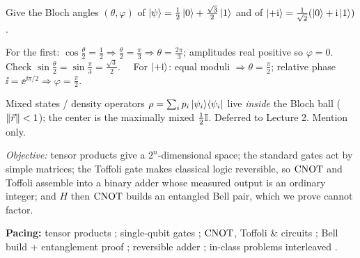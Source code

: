 \documentclass[11pt]{article}
\begin{document}
\begin{inclass}\label{ic:bloch}
Give the Bloch angles $(\theta,\varphi)$ of $\ket{\psi}=\tfrac12\ket0+\tfrac{\sqrt3}{2}\ket1$
and of $\ket{+\mathrm{i}}=\tfrac1{\sqrt2}(\ket0+\mathrm{i}\ket1)$.
\end{inclass}
\begin{answer}
For the first: $\cos\tfrac\theta2=\tfrac12\Rightarrow\tfrac\theta2=\tfrac\pi3
\Rightarrow\theta=\tfrac{2\pi}3$; amplitudes real positive so $\varphi=0$. Check
$\sin\tfrac\theta2=\sin\tfrac\pi3=\tfrac{\sqrt3}2$. \checkmark\ \ For $\ket{+\mathrm{i}}$:
equal moduli $\Rightarrow\theta=\tfrac\pi2$; relative phase $\ii=\ee^{\ii\pi/2}
\Rightarrow\varphi=\tfrac\pi2$.
\end{answer}

\begin{advanced}
Mixed states / density operators $\rho=\sum_i p_i\ket{\psi_i}\!\bra{\psi_i}$ live \emph{inside} the
Bloch ball ($\left\lVert \vec r \right\rVert<1$); the center is the maximally mixed $\tfrac12\mathbb{I}$.
Deferred to Lecture 2. Mention only.
\end{advanced}

\noindent\emph{Objective:} tensor products give a $2^n$-dimensional space; the
standard gates act by simple matrices; the Toffoli gate makes classical logic
reversible, so $\mathrm{CNOT}$ and Toffoli assemble into a binary adder whose measured
output is an ordinary integer; and $H$ then $\mathrm{CNOT}$ builds an entangled Bell pair,
which we prove cannot factor.

\medskip
\noindent\textbf{Pacing:} tensor products ; single-qubit gates ;
$\mathrm{CNOT}$, Toffoli \& circuits ; Bell build + entanglement proof ;
reversible adder ; in-class problems interleaved .
\end{document}
